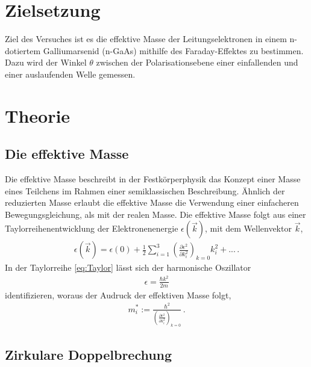 \section{Zielsetzung}
\label{sec:Ziel}

Ziel des Versuches ist es die effektive Masse der Leitungselektronen in einem n-dotiertem Galliumarsenid (n-GaAs) mithilfe des Faraday-Effektes zu bestimmen.
Dazu wird der Winkel $\theta$ zwischen der Polarisationsebene einer einfallenden und einer auslaufenden Welle gemessen.

\section{Theorie}
\label{sec:Theorie}

\subsection{Die effektive Masse}
\label{subsec:effektiveMasse}

Die effektive Masse beschreibt in der Festkörperphysik das Konzept einer Masse eines Teilchens im Rahmen einer semiklassischen Beschreibung. Ähnlich der reduzierten Masse
erlaubt die effektive Masse die Verwendung einer einfacheren Bewegungsgleichung, als mit der realen Masse.
Die effektive Masse folgt aus einer Taylorreihenentwicklung der Elektronenenergie $\epsilon(\vec k)$, mit dem Wellenvektor $\vec k$, 
\begin{align}
    \epsilon(\vec{k})=\epsilon\left(0\right)+\frac{1}{2}\sum_{i=1}^3\left(\frac{\partial\epsilon^2}{\partial k_i^2}\right)_{k=0}k_i^2+...\,.
    \label{eq:Taylor}
\end{align}
In der Taylorreihe \eqref{eq:Taylor} lässt sich der harmonische Oszillator
\begin{align*}
    \epsilon=\frac{\hbar k^2}{2m}
\end{align*}
identifizieren, woraus der Audruck der effektiven Masse folgt,
\begin{align}
    m_i^*:=\frac{\hbar^2}{\left(\frac{\partial\epsilon^2}{\partial k_i^2}\right)_{k=0}}\,.
\end{align}

\subsection{Zirkulare Doppelbrechung}
\label{subsec:ZirkulareDoppelbrechung}

